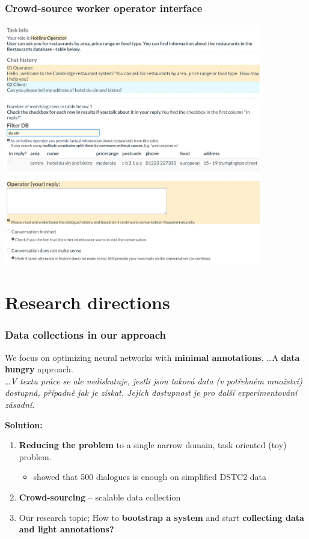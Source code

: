 \documentclass[10pt, compress,british,xcolor={svgnames,dvipsnames,x11names},trans]{beamer}
\begin{document}
\begin{frame}\frametitle{Crowd-source worker operator interface}
    \begin{center}
    \includegraphics[width=0.85\textwidth]{./gui-annotators-system.png}
    \end{center}
\end{frame}



\section{Research directions}  %

\begin{frame}\frametitle{Data collections in our approach}
    We focus on optimizing neural networks with {\bf minimal annotations}. \ldots A {\bf data hungry} approach. \\
    {\footnotesize \it \dots V textu práce se ale nediskutuje, jestli jsou taková data (v potřebném množství) dostupná, případně jak je získat. Jejich dostupnost je pro další experimentování zásadní.}
    
    {\bf \color{darkgreen} Solution:}\\
    \begin{enumerate}
        \item {\bf Reducing the problem} to a single narrow domain, task oriented (toy) problem.
            \begin{itemize}
                \item \citet{wen_networkbased_2016} showed that 500 dialogues is enough on simplified DSTC2 data
            \end{itemize}
        \item {\bf Crowd-sourcing} -- scalable data collection
        \item Our research topic; How to {\bf bootstrap a system} and start {\bf collecting data and light annotations?}
    \end{enumerate}
\end{frame}
\end{document}
